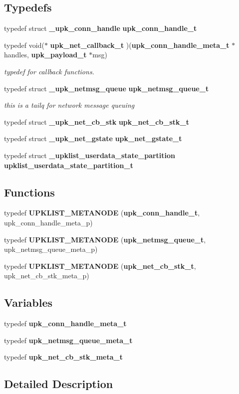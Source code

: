 \subsection*{Typedefs}
\begin{DoxyCompactItemize}
\item 
typedef struct {\bf \_\-upk\_\-conn\_\-handle} {\bf upk\_\-conn\_\-handle\_\-t}
\item 
typedef void($\ast$ {\bf upk\_\-net\_\-callback\_\-t} )({\bf upk\_\-conn\_\-handle\_\-meta\_\-t} $\ast$handles, {\bf upk\_\-payload\_\-t} $\ast$msg)
\begin{DoxyCompactList}\small\item\em typedef for callback functions. \end{DoxyCompactList}\item 
typedef struct {\bf \_\-upk\_\-netmsg\_\-queue} {\bf upk\_\-netmsg\_\-queue\_\-t}
\begin{DoxyCompactList}\small\item\em this is a tailq for network message queuing \end{DoxyCompactList}\item 
typedef struct {\bf \_\-upk\_\-net\_\-cb\_\-stk} {\bf upk\_\-net\_\-cb\_\-stk\_\-t}
\item 
typedef struct {\bf \_\-upk\_\-net\_\-gstate} {\bf upk\_\-net\_\-gstate\_\-t}
\item 
typedef struct {\bf \_\-upklist\_\-userdata\_\-state\_\-partition} {\bf upklist\_\-userdata\_\-state\_\-partition\_\-t}
\end{DoxyCompactItemize}
\subsection*{Functions}
\begin{DoxyCompactItemize}
\item 
typedef {\bf UPKLIST\_\-METANODE} ({\bf upk\_\-conn\_\-handle\_\-t}, upk\_\-conn\_\-handle\_\-meta\_\-p)
\item 
typedef {\bf UPKLIST\_\-METANODE} ({\bf upk\_\-netmsg\_\-queue\_\-t}, upk\_\-netmsg\_\-queue\_\-meta\_\-p)
\item 
typedef {\bf UPKLIST\_\-METANODE} ({\bf upk\_\-net\_\-cb\_\-stk\_\-t}, upk\_\-net\_\-cb\_\-stk\_\-meta\_\-p)
\end{DoxyCompactItemize}
\subsection*{Variables}
\begin{DoxyCompactItemize}
\item 
typedef {\bf upk\_\-conn\_\-handle\_\-meta\_\-t}
\item 
typedef {\bf upk\_\-netmsg\_\-queue\_\-meta\_\-t}
\item 
typedef {\bf upk\_\-net\_\-cb\_\-stk\_\-meta\_\-t}
\end{DoxyCompactItemize}


\subsection{Detailed Description}
